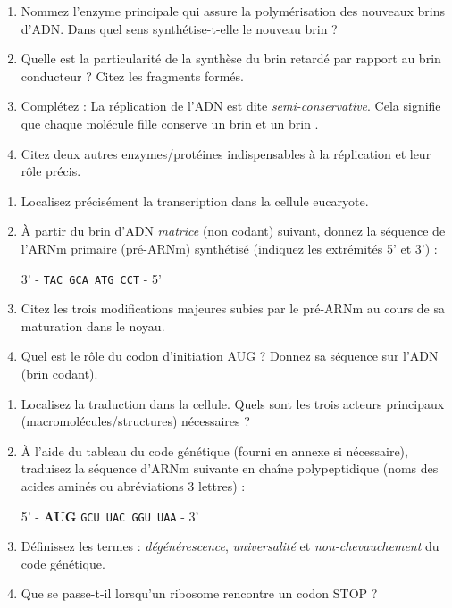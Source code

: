 \documentclass[11pt]{article}
\begin{document}
\begin{exercice}
\begin{enumerate}
    \item Nommez l'enzyme principale qui assure la polymérisation des nouveaux brins d'ADN. Dans quel sens synthétise-t-elle le nouveau brin ?
    \item Quelle est la particularité de la synthèse du brin retardé par rapport au brin conducteur ? Citez les fragments formés.
    \item Complétez : La réplication de l'ADN est dite \textit{semi-conservative}. Cela signifie que chaque molécule fille conserve un brin \underline{\hspace{3cm}} et un brin \underline{\hspace{3cm}}.
    \item Citez deux autres enzymes/protéines indispensables à la réplication et leur rôle précis.
\end{enumerate}
\end{exercice}

\begin{exercice}
\begin{enumerate}
    \item Localisez précisément la transcription dans la cellule eucaryote.
    \item À partir du brin d'ADN \textit{matrice} (non codant) suivant, donnez la séquence de l'ARNm primaire (pré-ARNm) synthétisé (indiquez les extrémités 5' et 3') :
    \begin{center}
        3' - \texttt{TAC GCA ATG CCT} - 5'
    \end{center}
    \item Citez les trois modifications majeures subies par le pré-ARNm au cours de sa maturation dans le noyau.
    \item Quel est le rôle du codon d'initiation AUG ? Donnez sa séquence sur l'ADN (brin codant).
\end{enumerate}
\end{exercice}

\begin{exercice}
\begin{enumerate}
    \item Localisez la traduction dans la cellule. Quels sont les trois acteurs principaux (macromolécules/structures) nécessaires ?
    \item À l'aide du tableau du code génétique (fourni en annexe si nécessaire), traduisez la séquence d'ARNm suivante en chaîne polypeptidique (noms des acides aminés ou abréviations 3 lettres) :
    \begin{center}
        5' - \textbf{AUG} \texttt{GCU UAC GGU UAA} - 3'
    \end{center}
    \item Définissez les termes : \textit{dégénérescence}, \textit{universalité} et \textit{non-chevauchement} du code génétique.
    \item Que se passe-t-il lorsqu'un ribosome rencontre un codon STOP ?
\end{enumerate}
\end{exercice}
\end{document}
